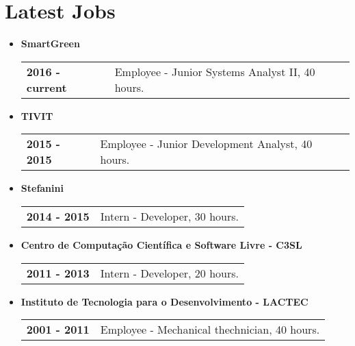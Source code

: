 \documentclass[pdftex, a4paper, 11pt]{article}
\begin{document}
\section*{Latest Jobs}
\begin{itemize}
\item \textbf{SmartGreen}\\
  \begin{tabular}{lp{13cm}}
    \textbf{2016 - current} & Employee - Junior Systems Analyst II, 40 hours.\\
  \end{tabular}

\item \textbf{TIVIT}\\
  \begin{tabular}{lp{13cm}}
    \textbf{2015 - 2015} & Employee - Junior Development Analyst, 40 hours.\\
  \end{tabular}

\item \textbf{Stefanini}\\
  \begin{tabular}{lp{13cm}}
    \textbf{2014 - 2015} & Intern - Developer, 30 hours.\\
  \end{tabular}

\item \textbf{Centro de Computação Científica e Software Livre - C3SL}\\
  \begin{tabular}{lp{13cm}}
    \textbf{2011 - 2013} & Intern - Developer, 20 hours.\\
  \end{tabular}
  
\item \textbf{Instituto de Tecnologia para o Desenvolvimento - LACTEC}\\
  \begin{tabular}{lp{13cm}}
    \textbf{2001 - 2011} & Employee - Mechanical thechnician, 40 hours.\\
  \end{tabular}
\end{itemize}

\end{document}

